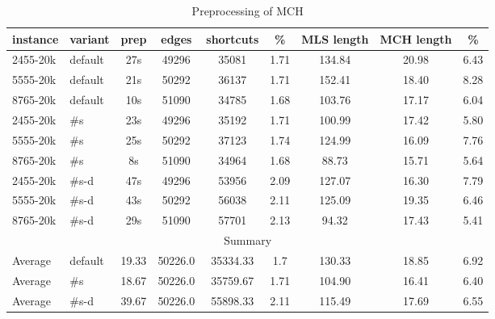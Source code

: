 %
\begin{table}
\tiny
\caption{Preprocessing of MCH}
\label{result2}
\begin{tabular}{l|l|c|ccc|ccc}
    instance & variant & prep & edges & shortcuts & \% & MLS length & MCH length & \% \\ \hline
2455-20k & default & 27s & 49296 & 35081 & 1.71 & 134.84 & 20.98 & 6.43 \\ \hline
5555-20k & default & 21s & 50292 & 36137 & 1.71 & 152.41 & 18.40 & 8.28 \\ \hline 
8765-20k & default & 10s & 51090 & 34785 & 1.68 & 103.76 & 17.17 & 6.04 \\ \hline
2455-20k & \#s & 23s & 49296 & 35192 & 1.71 & 100.99 & 17.42 & 5.80 \\ \hline
5555-20k & \#s & 25s & 50292 & 37123 & 1.74 & 124.99 & 16.09 & 7.76 \\ \hline
8765-20k & \#s & 8s & 51090 & 34964 & 1.68 & 88.73 & 15.71 & 5.64 \\ \hline
2455-20k & \#s-d & 47s & 49296 & 53956 & 2.09 & 127.07 & 16.30 & 7.79 \\ \hline
5555-20k & \#s-d & 43s & 50292 & 56038 & 2.11 & 125.09 & 19.35 & 6.46 \\ \hline
8765-20k & \#s-d & 29s & 51090 & 57701 & 2.13 & 94.32 & 17.43 & 5.41 \\ \hline
\multicolumn{9}{c}{Summary} \\ \hline
Average & default & 19.33 & 50226.0 & 35334.33 & 1.7 & 130.33 & 18.85 & 6.92 \\ \hline
Average & \#s & 18.67 & 50226.0 & 35759.67 & 1.71 & 104.90 & 16.41 & 6.40 \\ \hline
Average & \#s-d & 39.67 & 50226.0 & 55898.33 & 2.11 & 115.49 & 17.69 & 6.55 \\ \hline
\end{tabular}
\end{table}


